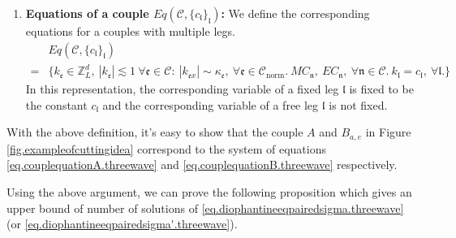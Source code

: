 \begin{defn}
\begin{enumerate}
    
    \item \textbf{Equations of a couple $Eq(\mathcal{C},\{c_{\mathfrak{l}}\}_{\mathfrak{l}})$:} We define the corresponding equations for a couples with multiple legs.
    \begin{equation}\label{eq.Eq(C,c).threewave}
    \begin{split}
        &Eq(\mathcal{C},\{c_{\mathfrak{l}}\}_{\mathfrak{l}})
        \\
        =&\{k_{\mathfrak{e}}\in \mathbb{Z}^d_L,\ |k_{\mathfrak{e}}|\lesssim 1\ \forall \mathfrak{e}\in \mathcal{C}:\  |k_{\mathfrak{e}x}| \sim \kappa_{\mathfrak{e}},\ \forall \mathfrak{e}\in \mathcal{C}_{\text{norm}}.\ MC_{\mathfrak{n}},\  EC_{\mathfrak{n}},\ \forall \mathfrak{n}\in \mathcal{C}.\ k_{\mathfrak{l}}=c_{\mathfrak{l}},\ \forall \mathfrak{l}.\}   
    \end{split}
    \end{equation}
    In this representation, the corresponding variable of a fixed leg $\mathfrak{l}$ is fixed to be the constant $c_{\mathfrak{l}}$ and the corresponding variable of a free leg $\mathfrak{l}$ is not fixed.
\end{enumerate}
\end{defn}

With the above definition, it's easy to show that the couple $A$ and $B_{a,e}$ in Figure \ref{fig.exampleofcuttingidea} correspond to the system of equations \eqref{eq.couplequationA.threewave} and \eqref{eq.couplequationB.threewave} respectively.


Using the above argument, we can prove the following proposition which gives an upper bound of number of solutions of \eqref{eq.diophantineeqpairedsigma.threewave} (or \eqref{eq.diophantineeqpairedsigma'.threewave}).

